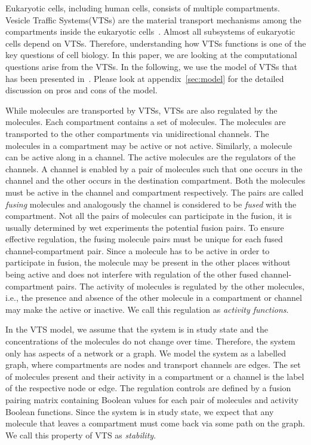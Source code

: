 Eukaryotic cells, including human cells, consists of multiple compartments.
%
Vesicle Traffic Systems(VTSs) are the material transport mechanisms
among the compartments inside the eukaryotic cells~\cite{vtsIntro}.
%
Almost all subsystems of eukaryotic cells depend on VTSs.
%
Therefore, understanding how VTSs functions is one of the key
questions of cell biology.
%
In this paper, we are looking at the computational questions 
arise from the VTSs.
%
In the following, we use the model of VTSs that has been presented
in~\cite{VTS}.
%
Please look at appendix~\ref{sec:model}
for the detailed discussion on pros and cons of the model.

While molecules are transported by VTSs, VTSs are also
regulated by the molecules.
%
Each compartment contains a set of molecules.
%
The molecules are transported to the other compartments via
unidirectional channels.  
%
The molecules in a compartment may be active or not active.
%
Similarly, a molecule can be active along in a channel. 
%
The active molecules are the regulators of the channels.
%
A channel is enabled by a pair of molecules
such that one occurs in the channel and the other
occurs in the destination compartment.
%
Both the molecules must be active in the channel
and compartment respectively.
%
The pairs are called {\em fusing} molecules and analogously
the channel is considered to be {\em fused} with the
compartment.
%
Not all the pairs of molecules can participate in the fusion, it is
usually determined by wet experiments the potential fusion pairs.
%
To ensure effective regulation, the fusing molecule pairs must be
unique for each fused channel-compartment pair.
%
Since a molecule has to be active in order to participate in fusion,
the molecule may be present in the other places without being active
and does not interfere with regulation of the other fused
channel-compartment pairs.
%
The activity of molecules is regulated by the other molecules, i.e.,
the presence and absence of the other molecule in a compartment or
channel may make the active or inactive.
%
We call this regulation as {\em activity functions}.

%
In the VTS model, we assume that the system is in study state and
the concentrations of the molecules do not change over time.
%
Therefore, the system only has aspects of a network or a graph.
%
We model the system as a labelled graph, where compartments are nodes and
transport channels are edges.
%
The set of molecules present and their activity in a compartment or
a channel is the label of the respective node or edge.
%
The regulation controls are defined by a fusion pairing matrix
containing Boolean values for each pair of molecules and activity
Boolean functions.
%
Since the system is in study state, we expect that any molecule that
leaves a compartment must come back via some path on the graph.
%
We call this property of VTS as {\em stability}.

